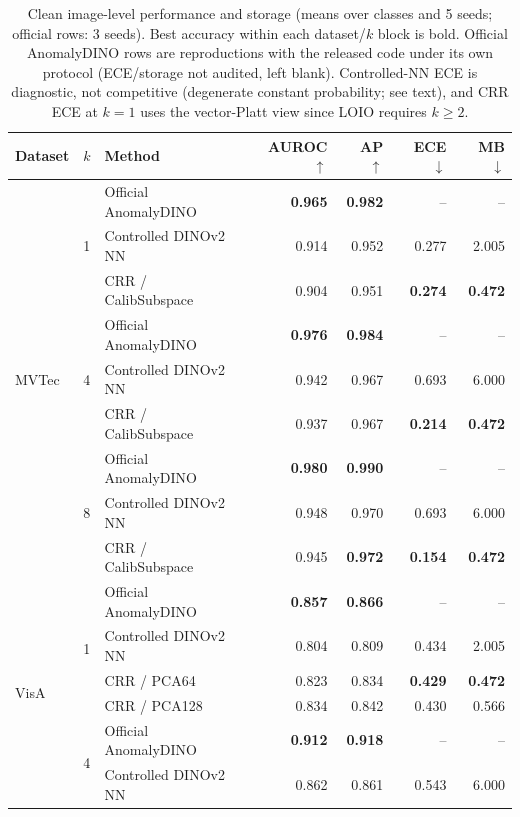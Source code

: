 \begin{table}[t]
\centering
\caption{Clean image-level performance and storage (means over classes and 5 seeds; official rows: 3 seeds). Best accuracy within each dataset/$k$ block is bold. Official AnomalyDINO rows are reproductions with the released code under its own protocol (ECE/storage not audited, left blank). Controlled-NN ECE is diagnostic, not competitive (degenerate constant probability; see text), and CRR ECE at $k{=}1$ uses the vector-Platt view since LOIO requires $k\ge2$.}
\label{tab:clean-efficiency}
\setlength{\tabcolsep}{2.4pt}
\footnotesize
\begin{tabular}{ll lrrrr}
\toprule
Dataset & $k$ & Method & AUROC $\uparrow$ & AP $\uparrow$ & ECE $\downarrow$ & MB $\downarrow$ \\
\midrule
\multirow{9}{*}{MVTec}
& \multirow{3}{*}{1} & Official AnomalyDINO & \textbf{0.965} & \textbf{0.982} & -- & -- \\
& & Controlled DINOv2 NN & 0.914 & 0.952 & 0.277 & 2.005 \\
& & CRR / CalibSubspace & 0.904 & 0.951 & \textbf{0.274} & \textbf{0.472} \\
\cmidrule(lr){2-7}
& \multirow{3}{*}{4} & Official AnomalyDINO & \textbf{0.976} & \textbf{0.984} & -- & -- \\
& & Controlled DINOv2 NN & 0.942 & 0.967 & 0.693 & 6.000 \\
& & CRR / CalibSubspace & 0.937 & 0.967 & \textbf{0.214} & \textbf{0.472} \\
\cmidrule(lr){2-7}
& \multirow{3}{*}{8} & Official AnomalyDINO & \textbf{0.980} & \textbf{0.990} & -- & -- \\
& & Controlled DINOv2 NN & 0.948 & 0.970 & 0.693 & 6.000 \\
& & CRR / CalibSubspace & 0.945 & \textbf{0.972} & \textbf{0.154} & \textbf{0.472} \\
\midrule
\multirow{12}{*}{VisA}
& \multirow{4}{*}{1} & Official AnomalyDINO & \textbf{0.857} & \textbf{0.866} & -- & -- \\
& & Controlled DINOv2 NN & 0.804 & 0.809 & 0.434 & 2.005 \\
& & CRR / PCA64 & 0.823 & 0.834 & \textbf{0.429} & \textbf{0.472} \\
& & CRR / PCA128 & 0.834 & 0.842 & 0.430 & 0.566 \\
\cmidrule(lr){2-7}
& \multirow{4}{*}{4} & Official AnomalyDINO & \textbf{0.912} & \textbf{0.918} & -- & -- \\
& & Controlled DINOv2 NN & 0.862 & 0.861 & 0.543 & 6.000 \\

\end{tabular}
\end{table}
